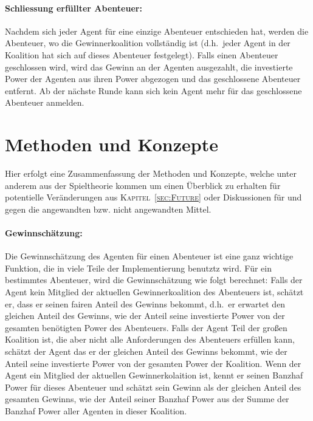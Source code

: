 \documentclass[fleqn,10pt]{SelfArx} %
\newcommand{\ChapterCite}[1]{\textsc{Kapitel~\ref{#1}}}
\begin{document}
\paragraph{Schliessung erfüllter Abenteuer:}
Nachdem sich jeder Agent für eine einzige Abenteuer entschieden hat, werden die Abenteuer, wo die Gewinnerkoalition vollständig ist (d.h.\ jeder Agent in der Koalition hat sich auf dieses Abenteuer festgelegt). Falls einen Abenteuer geschlossen wird, wird das Gewinn an der Agenten ausgezahlt, die investierte Power der Agenten aus ihren Power abgezogen und das geschlossene Abenteuer entfernt. Ab der nächste Runde kann sich kein Agent mehr für das geschlossene Abenteuer anmelden.

\section{Methoden und Konzepte}
\label{sec:Methoden}
Hier erfolgt eine Zusammenfassung der Methoden und Konzepte, welche unter anderem aus der Spieltheorie kommen um einen Überblick zu erhalten für potentielle Veränderungen aus \ChapterCite{sec:Future} oder Diskussionen für und gegen die angewandten bzw. nicht angewandten Mittel.

\paragraph{Gewinnschätzung:}
Die Gewinnschätzung des Agenten für einen Abenteuer ist eine ganz wichtige Funktion, die in viele Teile der Implementierung benutztz wird.
Für ein bestimmtes Abenteuer, wird die Gewinnschätzung wie folgt berechnet: Falls der Agent kein Mitglied der aktuellen Gewinnerkoalition des Abenteuers ist, schätzt er, dass er seinen fairen Anteil des Gewinns bekommt, d.h.\ er erwartet den gleichen Anteil des Gewinns, wie der Anteil seine investierte Power von der gesamten benötigten Power des Abenteuers. Falls der Agent Teil der großen Koalition ist, die aber nicht alle Anforderungen des Abenteuers erfüllen kann, schätzt der Agent das er der gleichen Anteil des Gewinns bekommt, wie der Anteil seine investierte Power von der gesamten Power der Koalition. Wenn der Agent ein Mitglied der aktuellen Gewinnerkolaition ist, kennt er seinen Banzhaf Power für dieses Abenteuer und schätzt sein Gewinn als der gleichen Anteil des gesamten Gewinns, wie der Anteil seiner Banzhaf Power aus der Summe der Banzhaf Power aller Agenten in dieser Koalition.
\end{document}
